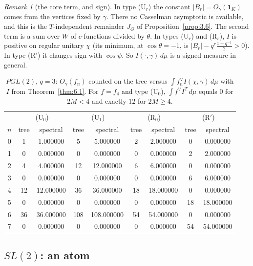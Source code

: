 \documentclass[12pt,letterpaper]{article}
\numberwithin{equation}{section}
\theoremstyle{plain}
\theoremstyle{remark}
\newtheorem{remarkn}[lemma]{Remark}%
\theoremstyle{plain}
\theoremstyle{definition}
\theoremstyle{remark}
\theoremstyle{remark}
\newcommand{\one}{\mathbf 1}
\begin{document}
\begin{remarkn}[the core term, and sign]\label{rem:6.3}
In type (U$_r$) the constant $|B_r|=O_\gamma(\one_K)$ comes from the vertices fixed by $\gamma$. There no Casselman asymptotic is available, and this is the $T$-independent remainder $J_G$ of Proposition~\ref{prop:3.6}. The second term is a sum over $W$ of $c$-functions divided by $\tilde\theta$. In types (U$_r$) and (R$_r$), $I$ is positive on regular unitary $\chi$ (its minimum, at $\cos\theta=-1$, is $|B_r|-q^r\frac{1+q^{-1}}2>0$). In type (R$'$) it changes sign with $\cos\psi$. So $I(\cdot,\gamma)\,d\mu$ is a signed measure in general.
\end{remarkn}

\begin{table}[h]
\centering
\begin{tabular}{c|cc|cc|cc|cc}
\toprule
& \multicolumn{2}{c|}{(U$_0$)} & \multicolumn{2}{c|}{(U$_1$)} & \multicolumn{2}{c|}{(R$_0$)} & \multicolumn{2}{c}{(R$'$)}\\
$n$ & tree & spectral & tree & spectral & tree & spectral & tree & spectral\\
\midrule
0 & 1 & 1.000000 & 5 & 5.000000 & 2 & 2.000000 & 0 & 0.000000\\
1 & 0 & 0.000000 & 0 & 0.000000 & 0 & 0.000000 & 2 & 2.000000\\
2 & 4 & 4.000000 & 12 & 12.000000 & 6 & 6.000000 & 0 & 0.000000\\
3 & 0 & 0.000000 & 0 & 0.000000 & 0 & 0.000000 & 6 & 6.000000\\
4 & 12 & 12.000000 & 36 & 36.000000 & 18 & 18.000000 & 0 & 0.000000\\
5 & 0 & 0.000000 & 0 & 0.000000 & 0 & 0.000000 & 18 & 18.000000\\
6 & 36 & 36.000000 & 108 & 108.000000 & 54 & 54.000000 & 0 & 0.000000\\
7 & 0 & 0.000000 & 0 & 0.000000 & 0 & 0.000000 & 54 & 54.000000\\
\bottomrule
\end{tabular}
\caption{$PGL(2)$, $q=3$: $O_\gamma(f_n)$ counted on the tree versus $\int f_n^\vee I(\chi,\gamma)\,d\mu$ with $I$ from Theorem~\ref{thm:6.1}. For $f=f_4$ and type (U$_0$), $\int f^\vee I^T\,d\mu$ equals $0$ for $2M<4$ and exactly $12$ for $2M\ge4$.}
\end{table}

\subsection{\texorpdfstring{$SL(2)$}{SL(2)}: an atom}\label{sec:6.2}
\end{document}
